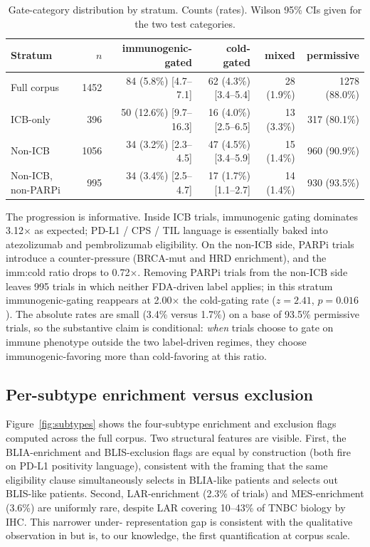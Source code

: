 \documentclass{article}
\begin{document}
\begin{table}[ht]
  \caption{Gate-category distribution by stratum.  Counts (rates).
    Wilson 95\% CIs given for the two test categories.}
  \label{tab:headline}
  \centering
  \small
  \begin{tabular}{lrrrrr}
    \toprule
    Stratum & $n$ & immunogenic-gated & cold-gated & mixed & permissive \\
    \midrule
    Full corpus & 1452 & 84 (5.8\%) [4.7--7.1] & 62 (4.3\%) [3.4--5.4] & 28 (1.9\%) & 1278 (88.0\%) \\
    ICB-only & 396 & 50 (12.6\%) [9.7--16.3] & 16 (4.0\%) [2.5--6.5] & 13 (3.3\%) & 317 (80.1\%) \\
    Non-ICB & 1056 & 34 (3.2\%) [2.3--4.5] & 47 (4.5\%) [3.4--5.9] & 15 (1.4\%) & 960 (90.9\%) \\
    Non-ICB, non-PARPi & 995 & 34 (3.4\%) [2.5--4.7] & 17 (1.7\%) [1.1--2.7] & 14 (1.4\%) & 930 (93.5\%) \\
    \bottomrule
  \end{tabular}
\end{table}

The progression is informative.  Inside ICB trials, immunogenic
gating dominates 3.12$\times$ as expected; PD-L1 / CPS / TIL language
is essentially baked into atezolizumab and pembrolizumab eligibility.
On the non-ICB side, PARPi trials introduce a counter-pressure
(BRCA-mut and HRD enrichment), and the imm:cold ratio drops to
0.72$\times$.  Removing PARPi trials from the non-ICB side leaves
995 trials in which neither FDA-driven label applies; in this
stratum immunogenic-gating reappears at 2.00$\times$ the cold-gating
rate ($z=2.41$, $p=0.016$).  The absolute rates are small (3.4\%
versus 1.7\%) on a base of 93.5\% permissive trials, so the
substantive claim is conditional: \emph{when} trials choose to gate
on immune phenotype outside the two label-driven regimes, they
choose immunogenic-favoring more than cold-favoring at this ratio.

\subsection{Per-subtype enrichment versus exclusion}

Figure~\ref{fig:subtypes} shows the four-subtype enrichment and
exclusion flags computed across the full corpus.  Two structural
features are visible.  First, the BLIA-enrichment and
BLIS-exclusion flags are equal by construction (both fire on PD-L1
positivity language), consistent with the framing that the same
eligibility clause simultaneously selects in BLIA-like patients and
selects out BLIS-like patients.  Second, LAR-enrichment (2.3\% of
trials) and MES-enrichment (3.6\%) are uniformly rare, despite LAR
covering 10--43\% of TNBC biology by IHC.  This narrower under-
representation gap is consistent with the qualitative observation
in \cite{hossain2021} but is, to our knowledge, the first
quantification at corpus scale.
\end{document}
